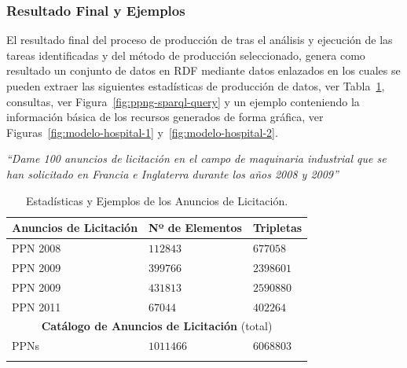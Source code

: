 % 
\cleardoublepage
\subsubsection{Resultado Final y Ejemplos}
El resultado final del proceso de producción de \linkeddata tras el análisis y ejecución 
de las tareas identificadas y del método de producción seleccionado, genera como resultado un conjunto de 
datos en \gls{RDF} mediante datos enlazados en los cuales se pueden extraer las siguientes 
estadísticas de producción de datos, ver Tabla~\ref{table:ppn-ejemplos}, consultas, ver Figura~\ref{fig:ppng-sparql-query} y un 
ejemplo conteniendo la información básica de los recursos generados de forma gráfica, ver Figuras~\ref{fig:modelo-hospital-1} y~\ref{fig:modelo-hospital-2}. 

\begin{Frame}
 \textit{``Dame 100 anuncios de licitación en el campo de maquinaria industrial que se han solicitado 
en Francia e Inglaterra durante los años 2008 y 2009''}
\end{Frame}
% 
% 
\begin{longtable}[c]{|p{4cm}|p{4cm}|p{3cm}|} 
\hline
  \textbf{Anuncios de Licitación} & \textbf{Nº de Elementos}  &  \textbf{Tripletas}  \\\hline
\endhead
PPN 2008 & $112843$  &   $677058$  \\ \hline
PPN 2009 & $399766$ &   $2398601$   \\ \hline
PPN 2009  & $431813$&  $2590880$  \\ \hline
PPN 2011 & $67044$&   $402264$   \\ \hline
\multicolumn{3}{|c|}{\textbf{Catálogo de Anuncios de Licitación} (total)} \\ \hline
PPNs & $1011466$ &  $6068803$   \\ \hline
\hline
\caption{Estadísticas y Ejemplos de los Anuncios de Licitación.}\label{table:ppn-ejemplos}\\    
\end{longtable}

